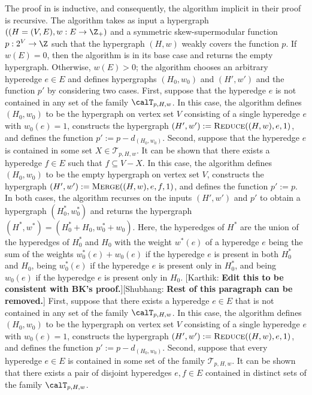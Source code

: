 \documentclass{article}
\newcommand{\maximalTightSetFamily}[1]{\ensuremath{\calT_{#1}}\xspace}
\newcommand{\shubhang}[1]{{\color{blue}[{\tiny Shubhang: \bf #1}]\marginpar{\color{blue}*}}}
\newcommand{\knote}[1]{{\color{red}[{\tiny Karthik: \bf #1}]\marginpar{\color{red}*}}}
\newcommand{\merge}{\ensuremath{\textsc{Merge}}\xspace}
\newcommand{\reduce}{\ensuremath{\textsc{Reduce}}\xspace}
\begin{document}
The proof in \cite{Bernath-Kiraly} is inductive, and consequently, the algorithm implicit in their proof is recursive. The algorithm takes as input a hypergraph $((H=(V, E), w: E\rightarrow \Z_+)$ and a symmetric skew-supermodular function $p: 2^V\rightarrow \Z$ such that the hypergraph $(H,w)$ weakly covers the function $p$. 
If $w(E) = 0$, then the algorithm is in its base case and returns the empty hypergraph. 
Otherwise, $w(E) > 0$; the algorithm chooses an arbitrary hyperedge $e \in E$ and defines hypergraphs $(H_0, w_0)$ and $(H', w')$ and the function $p'$ by considering two cases.
First, suppose that the hyperedge $e$ is not contained in any set of the family $\maximalTightSetFamily{p, H, w}$. 
In this case, the algorithm defines $(H_0, w_0)$ to be the hypergraph on vertex set $V$ consisting of a single hyperedge $e$ with $w_0(e) = 1$, constructs the hypergraph $(H', w'):=\reduce((H, w), e, 1)$, and defines the function $p' := p - d_{(H_0, w_0)}$. Second, suppose that the hyperedge $e$ is contained in some set $X \in \mathcal{T}_{p, H, w}$. It can be shown that there exists a hyperedge $f \in E$ such that $f \subseteq V - X$. In this case, the algorithm defines $(H_0, w_0)$ to be the empty hypergraph on vertex set $V$, constructs the hypergraph $(H', w'):=\merge((H, w), e, f, 1)$, and defines the function $p' := p$. In both cases, the algorithm recurses on the inputs $(H',w')$ and $p'$ to obtain a hypergraph $(H^*_0, w^*_0)$ and returns the hypergraph $(H^*, w^*) = (H^*_0 + H_0, w^*_0 + w_0)$. 
Here, the hyperedges of $H^*$ are the union of the hyperedges of $H^*_0$ and $H_0$ with the weight $w^*(e)$ of a hyperedge $e$ being the sum of the weights $w^*_0(e)+w_0(e)$ if the hyperedge $e$ is present in both $H^*_0$ and $H_0$, being $w^*_0(e)$ if the hyperedge $e$ is present only in $H^*_0$, and being $w_0(e)$ if the hyperedge $e$ is present only in $H_0$. 
\iffalse
\knote{Edit this to be consistent with BK's proof.}\shubhang{Rest of this paragraph can be removed.}
First, suppose that there exists a hyperedge $e\in E$ that is not contained in any set of the family $\maximalTightSetFamily{p, H, w}$. 
In this case, the algorithm defines $(H_0, w_0)$ to be the hypergraph on vertex set $V$ consisting of a single hyperedge $e$ with $w_0(e) = 1$,
constructs the hypergraph $(H', w'):=\reduce((H, w), e, 1)$, and defines the function $p' := p - d_{(H_0, w_0)}$.
Second, suppose that every hyperedge $e\in E$ is contained in some set of the family $\mathcal{T}_{p, H, w}$. It can be shown that there exists a pair of disjoint hyperedges $e, f\in E$ contained in distinct sets of the family $\maximalTightSetFamily{p, H, w}$.
\end{document}
